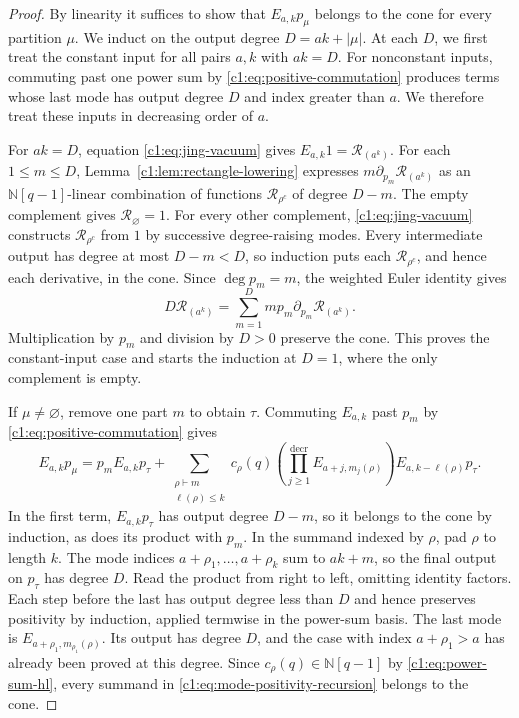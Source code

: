 \documentclass[12pt,reqno,a4paper]{amsart}
\numberwithin{equation}{section}
\numberwithin{figure}{section}
\theoremstyle{plain}
\theoremstyle{definition}
\begin{document}
\begin{proof}
By linearity it suffices to show that $E_{a,k}p_\mu$ belongs to the
cone for every partition $\mu$.  We induct on the output degree
$D=ak+|\mu|$.  At each $D$, we first treat the constant input for
all pairs $a,k$ with $ak=D$.  For nonconstant inputs, commuting past
one power sum by \eqref{c1:eq:positive-commutation} produces terms
whose last mode has output degree $D$ and index greater than $a$.
We therefore treat these inputs in decreasing order of $a$.

For $ak=D$, equation \eqref{c1:eq:jing-vacuum} gives
$E_{a,k}1=\mathcal R_{(a^k)}$.  For each $1\leq m\leq D$,
Lemma~\ref{c1:lem:rectangle-lowering} expresses
$m\partial_{p_m}\mathcal R_{(a^k)}$ as an $\mathbb N[q-1]$-linear
combination of functions $\mathcal R_{\rho^c}$ of degree $D-m$.
The empty complement gives $\mathcal R_\varnothing=1$.  For every
other complement, \eqref{c1:eq:jing-vacuum} constructs
$\mathcal R_{\rho^c}$ from $1$ by successive degree-raising modes.
Every intermediate output has degree at most $D-m<D$, so induction
puts each $\mathcal R_{\rho^c}$, and hence each derivative, in the cone.
Since $\deg p_m=m$, the weighted Euler identity gives
\begin{equation}\label{c1:eq:rectangle-euler}
 D\mathcal R_{(a^k)}
 =\sum_{m=1}^{D}m p_m\partial_{p_m}\mathcal R_{(a^k)}.
\end{equation}
Multiplication by $p_m$ and division by $D>0$ preserve the cone.
This proves the constant-input case and starts the induction at $D=1$,
where the only complement is empty.

If $\mu\ne\varnothing$, remove one part $m$ to obtain $\tau$.
Commuting $E_{a,k}$ past $p_m$ by \eqref{c1:eq:positive-commutation}
gives
\begin{equation}\label{c1:eq:mode-positivity-recursion}
 E_{a,k}p_\mu
 =p_mE_{a,k}p_\tau+\sum_{\substack{\rho\vdash m\\\ell(\rho)\leq k}}
 c_\rho(q)
 \left(\prod_{j\geq1}^{\mathrm{decr}}E_{a+j,m_j(\rho)}\right)
 E_{a,k-\ell(\rho)}p_\tau .
\end{equation}
In the first term, $E_{a,k}p_\tau$ has output degree $D-m$, so it
belongs to the cone by induction, as does its product with $p_m$.
In the summand indexed by $\rho$, pad $\rho$ to length $k$.
The mode indices $a+\rho_1,\ldots,a+\rho_k$ sum to $ak+m$, so the
final output on $p_\tau$ has degree $D$.  Read the product from right
to left, omitting identity factors.  Each step before the last has
output degree less than $D$ and hence preserves positivity by induction,
applied termwise in the power-sum basis.  The last mode is
$E_{a+\rho_1,m_{\rho_1}(\rho)}$.  Its output has degree $D$, and
the case with index $a+\rho_1>a$ has already been proved at this
degree.  Since $c_\rho(q)\in\mathbb N[q-1]$ by
\eqref{c1:eq:power-sum-hl}, every summand in
\eqref{c1:eq:mode-positivity-recursion} belongs to the cone.
\end{proof}
\end{document}
